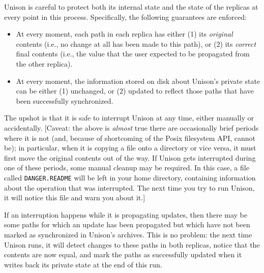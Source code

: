 \documentclass{article}
\begin{document}



Unison is careful to protect both its internal state and the state of
the replicas at every point in this process.  Specifically, the
following guarantees are enforced:
\begin{itemize}
\item At every moment, each path in each replica has either (1) its {\em
  original} contents (i.e., no change at all has been made to this
path), or (2) its {\em correct} final contents (i.e., the value that the
user expected to be propagated from the other replica).
\item At every moment, the information stored on disk about Unison's
private state can be either (1) unchanged, or (2) updated to reflect
those paths that have been successfully synchronized.
\end{itemize}
The upshot is that it is safe to interrupt Unison at any time, either
manually or accidentally.  [Caveat: the above is {\em almost} true there
are occasionally brief periods where it is not (and, because of
shortcoming of the Posix filesystem API, cannot be); in particular, when
it is copying a file onto a directory or vice versa, it must first move
the original contents out of the way.  If Unison gets
interrupted during one of these periods, some manual cleanup may be
required.  In this case, a file called {\tt DANGER.README} will be left
in your home directory, containing information about the operation that
was interrupted. The next time you try to run Unison, it will notice this
file and warn you about it.]

If an interruption happens while it is propagating updates, then there
may be some paths for which an update has been propagated but which
have not been marked as synchronized in Unison's archives.  This is no
problem: the next time Unison runs, it will detect changes to these
paths in both replicas, notice that the contents are now equal, and
mark the paths as successfully updated when it writes back its private
state at the end of this run.
\end{document}
